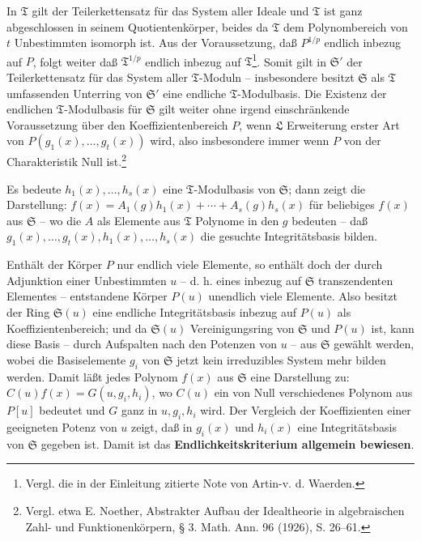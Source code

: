 In $\mathfrak T$ gilt der Teilerkettensatz für das System aller Ideale und $\mathfrak T$ ist ganz abgeschlossen in seinem Quotientenkörper, beides da $\mathfrak T$ dem Polynombereich von $t$ Unbestimmten isomorph ist. Aus der Voraussetzung, daß $P^{1/p}$ endlich inbezug auf $P$, folgt weiter daß $\mathfrak T^{1/p}$ endlich inbezug auf $\mathfrak T$\footnote{Vergl. die in der Einleitung zitierte Note von Artin-v. d. Waerden.}. Somit gilt in $\mathfrak S'$ der Teilerkettensatz für das System aller $\mathfrak T$-Moduln -- insbesondere besitzt $\mathfrak S$ als $\mathfrak T$ umfassenden Unterring von $\mathfrak S'$ eine endliche $\mathfrak T$-Modulbasis\footnotemark[\value{footnote}]. Die Existenz der endlichen $\mathfrak T$-Modulbasis für $\mathfrak S$ gilt weiter ohne irgend einschränkende Voraussetzung über den Koeffizientenbereich $P$, wenn $\mathfrak L$ Erweiterung erster Art von $P(g_1(x),\ldots,g_t(x))$ wird, also insbesondere immer wenn $P$ von der Charakteristik Null ist.\footnote{Vergl. etwa E. Noether, Abstrakter Aufbau der Idealtheorie in algebraischen Zahl- und Funktionenkörpern, § 3. Math. Ann. 96 (1926), S. 26--61.}

Es bedeute $h_1(x),\ldots,h_s(x)$ eine $\mathfrak T$-Modulbasis von $\mathfrak S$; dann zeigt die Darstellung: $f(x)=A_1(g)h_1(x)+\cdots+A_s(g)h_s(x)$ für beliebiges $f(x)$ aus $\mathfrak S$ -- wo die $A$ als Elemente aus $\mathfrak T$ Polynome in den $g$ bedeuten -- daß $g_1(x),\ldots,g_t(x),h_1(x),\ldots,h_s(x)$ die gesuchte Integritätsbasis bilden.

Enthält der Körper $P$ nur endlich viele Elemente, so enthält doch der durch Adjunktion einer Unbestimmten $u$ -- d. h. eines inbezug auf $\mathfrak S$ transzendenten Elementes -- entstandene Körper $P(u)$ unendlich viele Elemente. Also besitzt der Ring $\mathfrak S(u)$ eine endliche Integritätsbasis inbezug auf $P(u)$ als Koeffizientenbereich; und da $\mathfrak S(u)$ Vereinigungsring von $\mathfrak S$ und $P(u)$ ist, kann diese Basis -- durch Aufspalten nach den Potenzen von $u$ -- aus $\mathfrak S$ gewählt werden, wobei die Basiselemente $g_i$ von $\mathfrak S$ jetzt kein irreduzibles System mehr bilden werden. Damit läßt jedes Polynom $f(x)$ aus $\mathfrak S$ eine Darstellung zu: $C(u)f(x)=G(u,g_i,h_i)$, wo $C(u)$ ein von Null verschiedenes Polynom aus $P[u]$ bedeutet und $G$ ganz in $u,g_i,h_i$ wird. Der Vergleich der Koeffizienten einer geeigneten Potenz von $u$ zeigt, daß in $g_i(x)$ und $h_i(x)$ eine Integritätsbasis von $\mathfrak S$ gegeben ist. Damit ist das \textbf{Endlichkeitskriterium allgemein bewiesen}.

